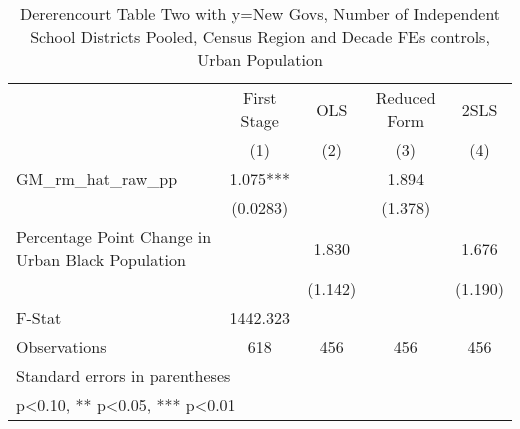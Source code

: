 \begin{table}[htbp]\centering
\def\sym#1{\ifmmode^{#1}\else\(^{#1}\)\fi}
\caption{Dererencourt Table Two with y=New Govs, Number of Independent School Districts  Pooled, Census Region and Decade FEs controls, Urban Population}
\begin{tabular}{l*{4}{c}}
\toprule
                    & First Stage   &         OLS   &Reduced Form   &        2SLS   \\
                    &\multicolumn{1}{c}{(1)}   &\multicolumn{1}{c}{(2)}   &\multicolumn{1}{c}{(3)}   &\multicolumn{1}{c}{(4)}   \\
\midrule
GM\_rm\_hat\_raw\_pp    &       1.075***&               &       1.894   &               \\
                    &    (0.0283)   &               &     (1.378)   &               \\
\addlinespace
Percentage Point Change in Urban Black Population&               &       1.830   &               &       1.676   \\
                    &               &     (1.142)   &               &     (1.190)   \\
\midrule
F-Stat              &    1442.323   &               &               &               \\
Observations        &         618   &         456   &         456   &         456   \\
\bottomrule
\multicolumn{5}{l}{\footnotesize Standard errors in parentheses}\\
\multicolumn{5}{l}{\footnotesize * p<0.10, ** p<0.05, *** p<0.01}\\
\end{tabular}
\end{table}
